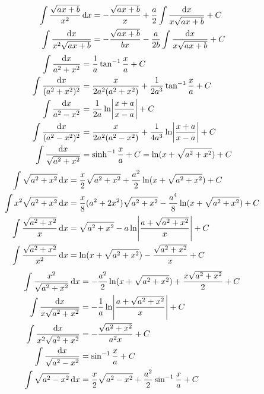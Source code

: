 \begin{align}
\int \frac{\sqrt{ax+b}}{x^{2}}\dif{x}&=-\frac{\sqrt{ax+b}}{x}+\frac{a}{2}\int \frac{\dif{x}}{x\sqrt{ax+b}}+C\\
\int\frac{\dif{x}}{x^{2}\sqrt{ax+b}}&=-\frac{\sqrt{ax+b}}{bx}-\frac{a}{2b}\int \frac{\dif{x}}{x\sqrt{ax+b}}+C\label{مساوات_جدول_تکمل_پندرہ}
\end{align}
\begin{align} 
\int \frac{\dif{x}}{a^{2}+x^{2}}&=\frac{1}{a}\tan^{-1}\frac{x}{a}+C \\
\int \frac{\dif{x}}{(a^{2}+x^{2})^{2}}&=\frac{x}{2a^{2}(a^{2}+x^{2})}+\frac{1}{2a^{3}}\tan^{-1}\frac{x}{a}+C\\
\int\frac{\dif{x}}{a^{2}-x^{2}}&=\frac{1}{2a}\ln\abs{\frac{x+a}{x-a}}+C\\
\int \frac{\dif{x}}{(a^{2}-x^{2})^{2}}&=\frac{x}{2a^2(a^2-x^2)}+\frac{1}{4a^3}\ln\abs{\frac{x+a}{x-a}}+C\\
\int \frac{\dif{x}}{\sqrt{a^{2}+x^{2}}}&=\sinh^{-1}\frac{x}{a}+C=\ln(x+\sqrt{a^{2}+x^{2}})+C
\end{align}
\begin{align} 
\int\sqrt{a^2+x^2}\dif x&=\frac{x}{2}\sqrt{a^2+x^2}+\frac{a^2}{2}\ln(x+\sqrt{a^2+x^2})+C\\
\int x^{2}\sqrt{a^{2}+x^{2}}\dif{x}&=\frac{x}{8}(a^{2}+2x^{2})\sqrt{a^{2}+x^{2}}-\frac{a^{4}}{8}\ln(x+\sqrt{a^{2}+x^{2}})+C\\
\int \frac{\sqrt{a^{2}+x^{2}}}{x}\dif{x}&=\sqrt{a^{2}+x^{2}}-a \ln \abs{\frac{a+\sqrt{a^{2}+x^{2}}}{x}}+C \\
\int \frac{\sqrt{a^{2}+x^{2}}}{x^{2}}\dif{x}&=\ln(x+\sqrt{a^{2}+x^{2}})-\frac{\sqrt{a^{2}+x^{2}}}{x}+C
\end{align}
\begin{align} 
\int \frac{x^{2}}{\sqrt{a^{2}+x^{2}}}\dif{x}&=-\frac{a^{2}}{2}\ln(x+\sqrt{a^{2}+x^{2}})+\frac{x\sqrt{a^{2}+x^{2}}}{2}+C\\
\int \frac{\dif{x}}{x\sqrt{a^{2}+x^{2}}}&=-\frac{1}{a}\ln\abs{\frac{a+\sqrt{a^{2}+x^{2}}}{x}}+C\\
\int \frac{\dif{x}}{x^{2}\sqrt{a^{2}+x^{2}}}&=-\frac{\sqrt{a^{2}+x^{2}}}{a^{2}x}+C\\
\int \frac{\dif{x}}{\sqrt{a^{2}-x^{2}}}&=\sin^{-1}\frac{x}{a}+C\\ 
\int \sqrt{a^{2}-x^{2}}\dif{x}&=\frac{x}{2}\sqrt{a^{2}-x^{2}}+\frac{a^{2}}{2}\sin ^{-1}\frac{x}{a}+C
\end{align}
